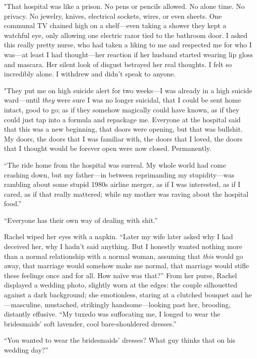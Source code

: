"That hospital was like a prison. No pens or pencils allowed. No alone
time. No privacy. No jewelry, knives, electrical sockets, wires, or even
sheets. One communal TV chained high on a shelf---even taking a shower
they kept a watchful eye, only allowing one electric razor tied to the
bathroom door. I asked this really pretty nurse, who had taken a liking
to me and respected me for who I was---at least I had thought---her
reaction if her husband started wearing lip gloss and mascara. Her
silent look of disgust betrayed her real thoughts. I felt so incredibly
alone. I withdrew and didn't speak to anyone.

"They put me on high suicide alert for two weeks---I was already in a
high suicide ward---until \emph{they} were sure I was no longer
suicidal, that I could be sent home intact, good to go; as if they
somehow magically could have known, as if they could just tap into a
formula and repackage me. Everyone at the hospital said that this was a
new beginning, that doors were opening, but that was bullshit. My doors,
the doors that I was familiar with, the doors that I loved, the doors
that I thought would be forever open were now closed. Permanently.

``The ride home from the hospital was surreal. My whole world had come
crashing down, but my father---in between reprimanding my
stupidity---was rambling about some stupid 1980s airline merger, as if I
was interested, as if I cared, as if that really mattered; while my
mother was raving about the hospital food.''

``Everyone has their own way of dealing with shit.''

Rachel wiped her eyes with a napkin. ``Later my wife later asked why I
had deceived her, why I hadn't said anything. But I honestly wanted
nothing more than a normal relationship with a normal woman, assuming
that \emph{this} would go away, that marriage would somehow make me
normal, that marriage would stifle these feelings once and for all. How
naïve was that?'' From her purse, Rachel displayed a wedding photo,
slightly worn at the edges: the couple silhouetted against a dark
background; she emotionless, staring at a clutched bouquet and
he---masculine, mustached, strikingly handsome---looking past her,
brooding, distantly effusive. ``My tuxedo was suffocating me, I longed
to wear the bridesmaids' soft lavender, cool bare-shouldered dresses.''

``You wanted to wear the bridesmaids' dresses? What guy thinks that on
his wedding day?''

